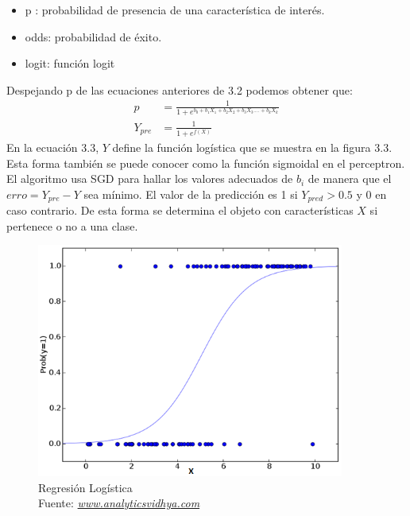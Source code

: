 \begin{itemize}
 	\item p : probabilidad de presencia de una característica de interés.
 	\item odds: probabilidad de éxito.
 	\item logit: función logit
 \end{itemize}
 
 Despejando p de las ecuaciones anteriores de 3.2 podemos obtener que:
  \begin{equation}
  \label{eq:t1}
  \begin{aligned}
  p&=\frac{1}{1+e^{b_{0}+b_{1}X_{1}+b_{2}X_{2}+b_{3}X_{3}....+b_{k}X_{k}}} \\
  Y_{pre}&=\frac{1}{1+e^{f(X)}}
  \end{aligned}
  \end{equation}
 En la ecuación 3.3, $Y$ define la función logística que se muestra en la figura 3.3. Esta forma también se puede conocer como la función sigmoidal en el perceptron.
 El algoritmo usa SGD para hallar los valores adecuados de $b_{i}$ de manera que el $erro=Y_{pre}- Y$ sea mínimo.
 El valor de la predicción es 1 si $Y_{pred}>0.5$ y 0 en caso contrario. De esta forma se determina el objeto con características $X$ si pertenece o no a una clase.
 
 \begin{figure}[H]
 	\centering
 	\includegraphics[width=0.9\textwidth]{Figures/logistic.png}
 	\caption{Regresión Logística \\ Fuente:  \href{https://www.analyticsvidhya.com/blog/2017/09/common-machine-learning-algorithms/}{\textit{www.analyticsvidhya.com}}}
 	\label{Regresión Logistica}
 \end{figure} 
